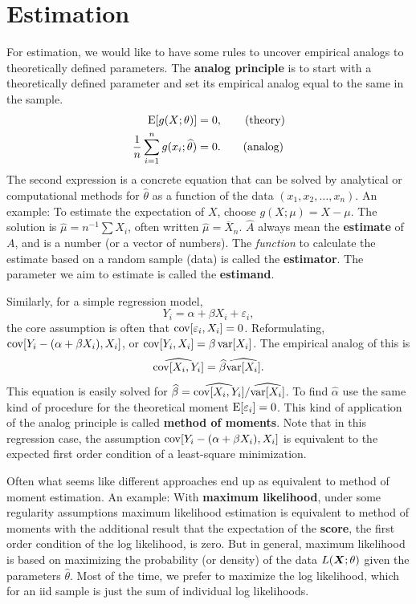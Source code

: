 \documentclass[10pt]{article}
\begin{document}
\section{Estimation}

For estimation, we would like to have some rules to uncover empirical analogs
to theoretically defined parameters. The \textbf{analog principle} is to 
start with a theoretically defined parameter and set its
empirical analog equal to the same in the sample. 
\begin{align}
  \operatorname{E}[g(X;\theta)] &= 0, \tag{theory} \\
  \frac{1}{n}\sum_{i=1}^n g(x_i;\widehat{\theta}) &= 0. \tag{analog} 
\end{align}
The second expression is a concrete equation that can be solved by analytical 
or computational methods for $\widehat{\theta}$ as a function of the data $(x_1,x_2,\dots,x_n)$.
An example: To estimate the expectation of $X$, choose $g(X;\mu)=X-\mu$.
The solution is  $\widehat{\mu} = n^{-1}\sum X_i$,
often written $\widehat{\mu}=\overline{X}_n$. 
$\widehat{A}$ always mean the \textbf{estimate} of $A$, and is a number (or a vector of numbers). 
The \emph{function} to calculate the estimate based on a random sample (data) is called 
the \textbf{estimator}.  The parameter we aim to estimate is called the \textbf{estimand}.


Similarly, for a simple regression model,
\[ Y_i = \alpha + \beta X_i + \varepsilon_i,\] the core assumption is often that $\operatorname{cov}[\varepsilon_i,X_i]=0$.
Reformulating, $\operatorname{cov}[Y_i - (\alpha + \beta X_i), X_i]$, or $\operatorname{cov}[Y_i,X_i] = \beta \operatorname{var}[X_i]$.
The empirical analog of this is 
\[ \widehat{\operatorname{cov}[X_i,Y_i]} = \widehat{\beta} \widehat{\operatorname{var}[X_i]}.\]
This equation
is easily solved for $\widehat{\beta} = \widehat{\operatorname{cov}[X_i,Y_i]} / \widehat{\operatorname{var}[X_i]}$.  To find
$\widehat{\alpha}$ use the same kind of procedure for the theoretical moment $\operatorname{E}[\varepsilon_i]=0$. This kind
of application of the analog principle is called \textbf{method of moments}. Note
that in this regression case, the assumption $\operatorname{cov}[Y_i - (\alpha + \beta X_i), X_i]$ is equivalent
to the expected first order condition of a least-square minimization.

Often what seems like different approaches end up as equivalent to method of moment estimation.
An example: With \textbf{maximum likelihood}, under some regularity assumptions maximum likelihood 
estimation is equivalent to method of moments with the additional result that the expectation 
of the \textbf{score}, the first order condition of the log likelihood, is zero. But in general,
maximum likelihood is based on maximizing the probability (or density) of the data $L(\bm X;\theta)$ 
given the parameters $\widehat{\theta}$. Most of the time, we prefer to maximize the log likelihood,
which for an iid sample is just the sum of individual log likelihoods.
\end{document}
